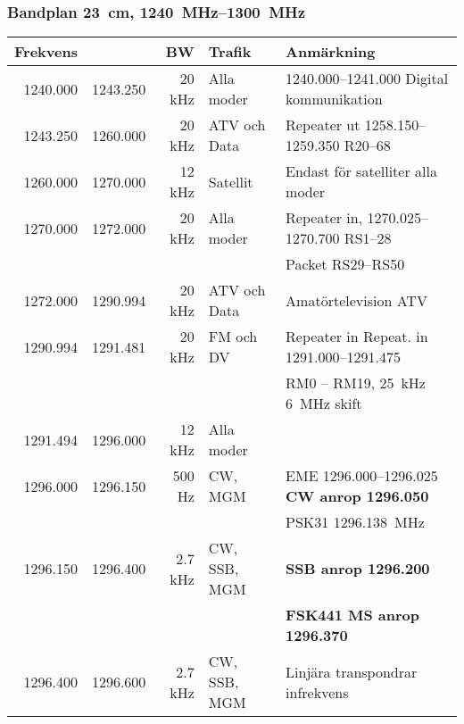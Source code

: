 \subsubsection{Bandplan \qty{23}{\centi\metre}, \SIrange{1240}{1300}{\mega\hertz}}
\begin{tabular}{rrrll}
	\textbf{Frekvens} &          & \textbf{BW} & \textbf{Trafik} & \textbf{Anmärkning}          \\ \hline

1240.000 & 1243.250 & 20 kHz  & Alla moder   & \numrange{1240,000}{1241,000} Digital kommunikation           \\ \hline
1243.250 & 1260.000 & 20 kHz  & ATV och Data & Repeater ut \numrange{1258,150}{1259,350}  R20--68            \\ \hline
1260.000 & 1270.000 & 12 kHz  & Satellit     & Endast för satelliter alla moder                              \\ \hline
1270.000 & 1272.000 & 20 kHz  & Alla moder   & Repeater in, \numrange{1270,025}{1270,700} RS1--28            \\
	 &          &         &              & Packet RS29--RS50                                             \\ \hline
1272.000 & 1290.994 & 20 kHz  & ATV och Data & Amatörtelevision ATV                                          \\ \hline
1290.994 & 1291.481 & 20 kHz  & FM och DV    & Repeater in Repeat. in \numrange{1291,000}{1291,475}          \\
	 &          &         &              & RM0 – RM19, \qty{25}{\kilo\hertz} \qty{6}{\mega\hertz} skift    \\ \hline
1291.494 & 1296.000 & 12 kHz  & Alla moder   &                                                               \\ \hline
1296.000 & 1296.150 & 500 Hz  & CW,  MGM     & EME \numrange{1296,000}{1296,025} \textbf{CW anrop 1296.050}  \\
	 &          &         &              & PSK31 \qty{1296,138}{\mega\hertz}                              \\ \hline
1296.150 & 1296.400 & 2.7 kHz & CW, SSB, MGM & \textbf{SSB anrop \num{1296,200}}                             \\
	 &          &         &              & \textbf{FSK441 MS anrop \num{1296,370}}                       \\ \hline
1296.400 & 1296.600 & 2.7 kHz & CW, SSB, MGM & Linjära transpondrar infrekvens                               \\ \hline

\end{tabular}
